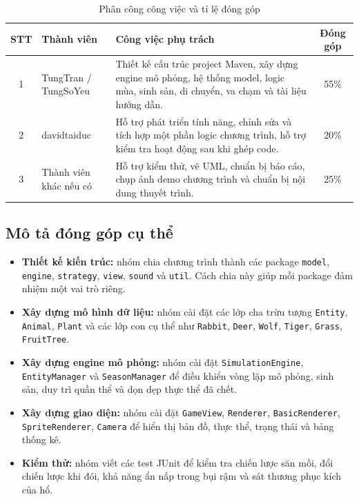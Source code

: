 \documentclass[12pt,a4paper]{article}
\begin{document}
\begin{table}[H]
    \centering
    \caption{Phân công công việc và tỉ lệ đóng góp}
    \begin{tabular}{|c|p{4cm}|p{7cm}|c|}
        \hline
        \textbf{STT} & \textbf{Thành viên} & \textbf{Công việc phụ trách} & \textbf{Đóng góp} \\
        \hline
        1 & TungTran / TungSoYeu
        & Thiết kế cấu trúc project Maven, xây dựng engine mô phỏng, hệ thống model, logic mùa, sinh sản, di chuyển, va chạm và tài liệu hướng dẫn.
        & 55\% \\
        \hline
        2 & davidtaiduc
        & Hỗ trợ phát triển tính năng, chỉnh sửa và tích hợp một phần logic chương trình, hỗ trợ kiểm tra hoạt động sau khi ghép code.
        & 20\% \\
        \hline
        3 & Thành viên khác nếu có
        & Hỗ trợ kiểm thử, vẽ UML, chuẩn bị báo cáo, chụp ảnh demo chương trình và chuẩn bị nội dung thuyết trình.
        & 25\% \\
        \hline
    \end{tabular}
\end{table}

\subsection{Mô tả đóng góp cụ thể}

\begin{itemize}
    \item \textbf{Thiết kế kiến trúc:} nhóm chia chương trình thành các package \texttt{model}, \texttt{engine}, \texttt{strategy}, \texttt{view}, \texttt{sound} và \texttt{util}. Cách chia này giúp mỗi package đảm nhiệm một vai trò riêng.
    \item \textbf{Xây dựng mô hình dữ liệu:} nhóm cài đặt các lớp cha trừu tượng \texttt{Entity}, \texttt{Animal}, \texttt{Plant} và các lớp con cụ thể như \texttt{Rabbit}, \texttt{Deer}, \texttt{Wolf}, \texttt{Tiger}, \texttt{Grass}, \texttt{FruitTree}.
    \item \textbf{Xây dựng engine mô phỏng:} nhóm cài đặt \texttt{SimulationEngine}, \texttt{EntityManager} và \texttt{SeasonManager} để điều khiển vòng lặp mô phỏng, sinh sản, duy trì quần thể và dọn dẹp thực thể đã chết.
    \item \textbf{Xây dựng giao diện:} nhóm cài đặt \texttt{GameView}, \texttt{Renderer}, \texttt{BasicRenderer}, \texttt{SpriteRenderer}, \texttt{Camera} để hiển thị bản đồ, thực thể, trạng thái và bảng thống kê.
    \item \textbf{Kiểm thử:} nhóm viết các test JUnit để kiểm tra chiến lược săn mồi, đổi chiến lược khi đói, khả năng ẩn nấp trong bụi rậm và sát thương phục kích của hổ.
\end{itemize}
\end{document}
